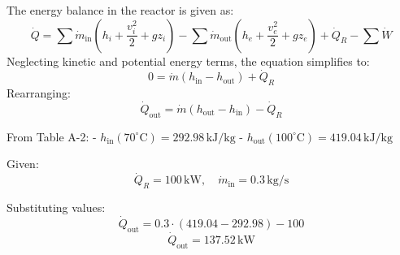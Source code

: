 The energy balance in the reactor is given as:  
\[
\dot{Q} = \sum \dot{m}_{\text{in}} \left( h_i + \frac{v_i^2}{2} + g z_i \right) - \sum \dot{m}_{\text{out}} \left( h_e + \frac{v_e^2}{2} + g z_e \right) + \dot{Q}_R - \sum \dot{W}
\]  
Neglecting kinetic and potential energy terms, the equation simplifies to:  
\[
0 = \dot{m} \left( h_{\text{in}} - h_{\text{out}} \right) + \dot{Q}_R
\]  
Rearranging:  
\[
\dot{Q}_{\text{out}} = \dot{m} \left( h_{\text{out}} - h_{\text{in}} \right) - \dot{Q}_R
\]  

From Table A-2:  
- \( h_{\text{in}}(70^\circ\text{C}) = 292.98 \, \text{kJ/kg} \)  
- \( h_{\text{out}}(100^\circ\text{C}) = 419.04 \, \text{kJ/kg} \)  

Given:  
\[
\dot{Q}_R = 100 \, \text{kW}, \quad \dot{m}_{\text{in}} = 0.3 \, \text{kg/s}
\]  

Substituting values:  
\[
\dot{Q}_{\text{out}} = 0.3 \cdot (419.04 - 292.98) - 100
\]  
\[
\dot{Q}_{\text{out}} = 137.52 \, \text{kW}
\]